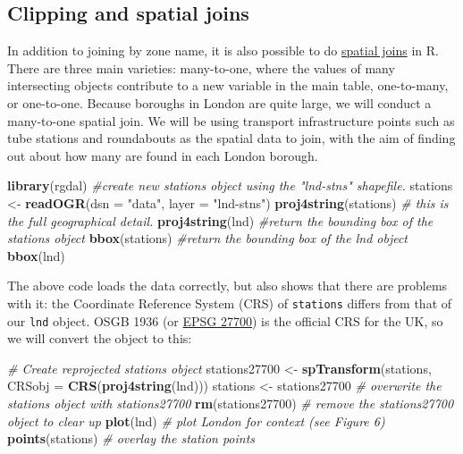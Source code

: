 \documentclass[]{article}
\newenvironment{Shaded}{}{}
\newcommand{\KeywordTok}[1]{\textcolor[rgb]{0.00,0.44,0.13}{\textbf{{#1}}}}
\newcommand{\DataTypeTok}[1]{\textcolor[rgb]{0.56,0.13,0.00}{{#1}}}
\newcommand{\StringTok}[1]{\textcolor[rgb]{0.25,0.44,0.63}{{#1}}}
\newcommand{\CommentTok}[1]{\textcolor[rgb]{0.38,0.63,0.69}{\textit{{#1}}}}
\newcommand{\NormalTok}[1]{{#1}}
\begin{document}
\subsection{Clipping and spatial
joins}\label{clipping-and-spatial-joins}

In addition to joining by zone name, it is also possible to do
\href{http://help.arcgis.com/en/arcgisdesktop/10.0/help/index.html\#//00080000000q000000}{spatial
joins} in R. There are three main varieties: many-to-one, where the
values of many intersecting objects contribute to a new variable in the
main table, one-to-many, or one-to-one. Because boroughs in London are
quite large, we will conduct a many-to-one spatial join. We will be
using transport infrastructure points such as tube stations and
roundabouts as the spatial data to join, with the aim of finding out
about how many are found in each London borough.

\begin{Shaded}
\begin{Highlighting}[]
\KeywordTok{library}\NormalTok{(rgdal)}
\CommentTok{#create new stations object using the "lnd-stns" shapefile.}
\NormalTok{stations <-}\StringTok{ }\KeywordTok{readOGR}\NormalTok{(}\DataTypeTok{dsn =} \StringTok{"data"}\NormalTok{, }\DataTypeTok{layer =} \StringTok{"lnd-stns"}\NormalTok{)}
\KeywordTok{proj4string}\NormalTok{(stations) }\CommentTok{# this is the full geographical detail.}
\KeywordTok{proj4string}\NormalTok{(lnd)}
\CommentTok{#return the bounding box of the stations object}
\KeywordTok{bbox}\NormalTok{(stations)}
\CommentTok{#return the bounding box of the lnd object}
\KeywordTok{bbox}\NormalTok{(lnd)}
\end{Highlighting}
\end{Shaded}

The above code loads the data correctly, but also shows that there are
problems with it: the Coordinate Reference System (CRS) of
\texttt{stations} differs from that of our \texttt{lnd} object. OSGB
1936 (or \href{http://spatialreference.org/ref/epsg/27700/}{EPSG 27700})
is the official CRS for the UK, so we will convert the object to this:

\begin{Shaded}
\begin{Highlighting}[]
\CommentTok{# Create reprojected stations object}
\NormalTok{stations27700 <-}\StringTok{ }\KeywordTok{spTransform}\NormalTok{(stations, }\DataTypeTok{CRSobj =} \KeywordTok{CRS}\NormalTok{(}\KeywordTok{proj4string}\NormalTok{(lnd)))}
\NormalTok{stations <-}\StringTok{ }\NormalTok{stations27700 }\CommentTok{# overwrite the stations object with stations27700}
\KeywordTok{rm}\NormalTok{(stations27700) }\CommentTok{# remove the stations27700 object to clear up}
\KeywordTok{plot}\NormalTok{(lnd) }\CommentTok{# plot London for context (see Figure 6)}
\KeywordTok{points}\NormalTok{(stations) }\CommentTok{# overlay the station points}
\end{Highlighting}
\end{Shaded}
\end{document}
